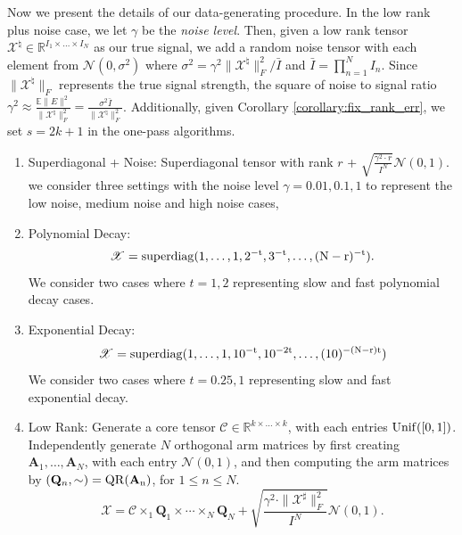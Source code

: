 Now we present the details of our data-generating procedure. In the low rank plus noise case, we let $\gamma$ be the \textit{noise level}. Then, given a low rank tensor $\mathscr{X}^\natural\in \mathbb{R}^{I_1\times \dots \times I_N}$ as our true signal, we add a random noise tensor with each element from $\mathcal{N}(0, \sigma^2)$ where $\sigma^2 = \gamma^2 \|\mathscr{X}^\natural\|_F^2 / \bar{I}$ and $\bar{I} = \prod_{n=1}^N I_n$. Since $\|\mathscr{X}^\natural\|_F$ represents the true signal strength, the square of noise to signal ratio $\gamma^2 \approx \frac{\mathbb{E} \|E\|^2}{\|\mathscr{X}^\natural\|_F^2}= \frac{\sigma^2 \bar{I}}{\|\mathscr{X}^\natural\|_F^2}$. Additionally, given Corollary \ref{corollary:fix_rank_err}, we set $s = 2k+1$ in the one-pass algorithms.
\begin{enumerate}[topsep=0pt,itemsep=-1ex,partopsep=1ex,parsep=1ex]
    \item Superdiagonal + Noise: Superdiagonal tensor with rank $r$ + $\sqrt{\frac{\gamma^2 \cdot r}{I^N}} \mathcal{N}(0,1)$. we consider three settings with the noise level $\gamma = 0.01, 0.1, 1$ to represent the low noise, medium noise and high noise cases,
    \item Polynomial Decay: 
    \begin{equation}
        \mathscr{X} = \rm{superdiag}(1,\dots,1, 2^{-t},3^{-t},\dots, (N-r)^{-t}).
    \end{equation}
    We consider two cases where $t = 1,2$ representing slow and fast polynomial decay cases. 
    \item Exponential Decay: 
    \begin{equation}
        \mathscr{X} =  \rm{superdiag}(1,\dots,1, 10^{-t},10^{-2t},\dots, (10)^{-(N-r)t}) 
    \end{equation}
    We consider two cases where $t = 0.25,1$ representing slow and fast exponential decay. 
    \item Low Rank: Generate a core tensor $\mathscr{C} \in \mathbb{R}^{k \times \dots \times k}$, with each entries $\rm{Unif}([0,1])$. Independently generate $N$ orthogonal arm matrices by first creating $\mathbf{A}_1, \dots, \mathbf{A}_N$, with each entry $\mathcal{N}(0,1)$, and then computing the arm matrices by $(\mathbf{Q}_n, \sim) = \rm{QR}(\mathbf{A}_n)$, for $1 \leq n \leq N$.  
    \begin{equation}
        \mathscr{X} = \mathscr{C} \times_1 \mathbf{Q}_1 \times \cdots \times_N \mathbf{Q}_N + \sqrt{\frac{\gamma^2 \cdot \|\mathscr{X}^\sharp\|_F^2}{I^N}} \mathcal{N}(0,1).
    \end{equation}
\end{enumerate}

